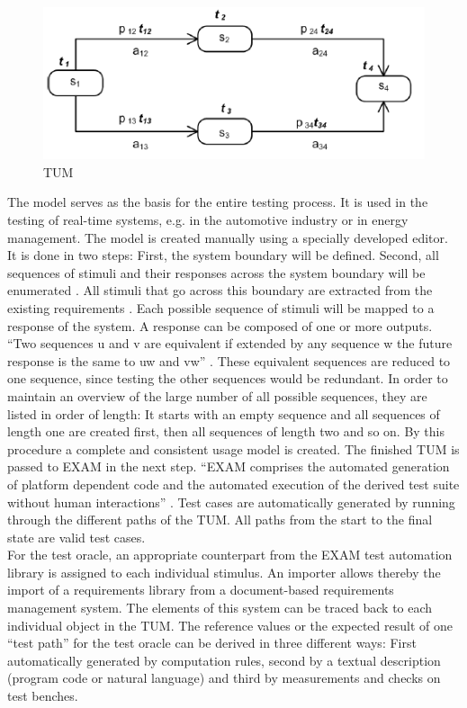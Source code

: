\begin{figure}[H]
	\centering
	\includegraphics{../images/TUM}
	\caption{TUM \cite{Siegl2010}}
\end{figure}
The model serves as the basis for the entire testing process. It is
used in the testing of real-time systems, e.g. in the automotive industry
or in energy management. The model is created manually using a specially
developed editor. \\
It is done in two steps: First, the system boundary will be defined.
Second, all sequences of stimuli and their responses across the system
boundary will be enumerated \cite{Siegl2010}. All stimuli that go
across this boundary are extracted from the existing requirements
\cite{Siegl2010}. Each possible sequence of stimuli will be mapped
to a response of the system. A response can be composed of one or
more outputs. \enquote{Two sequences u and v are equivalent if
extended by any sequence w the future response is the same to uw and
vw} \cite{Siegl2010}. These equivalent sequences are
reduced to one sequence, since testing the other sequences would be
redundant. In order to maintain an overview of the large number of
all possible sequences, they are listed in order of length: It starts
with an empty sequence \textlambda{}
and all sequences of length one
are created first, then all sequences of length two and so on. By
this procedure a complete and consistent usage model is created. The
finished TUM is passed to EXAM in the next step. \enquote{EXAM
comprises the automated generation of platform dependent code and
the automated execution of the derived test suite without human interactions}
\cite{Siegl2010}. Test cases are automatically generated by running
through the different paths of the TUM. All paths from the start to
the final state are valid test cases.\\
For the test oracle, an appropriate counterpart from the EXAM test
automation library is assigned to each individual stimulus. An importer
allows thereby the import of a requirements library from a document-based
requirements management system. The elements of this system can be
traced back to each individual object in the TUM. The reference values
or the expected result of one \enquote{test path}
for the test oracle can be derived in three different ways: First
automatically generated by computation rules, second by a textual
description (program code or natural language) and third by measurements
and checks on test benches.

